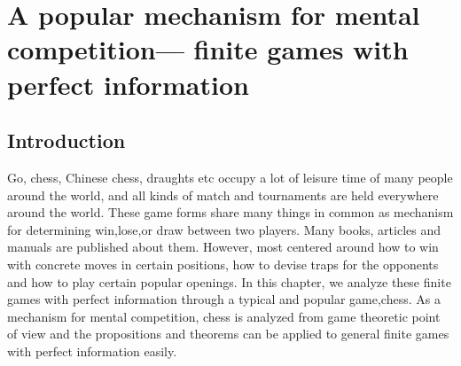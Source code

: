 
\chapter{A popular mechanism for mental competition--- finite games with perfect information}  %

\label{Chapter5} %



\section{Introduction}
 Go, chess, Chinese chess, draughts etc occupy a lot of leisure time of many people around the world, and all kinds of match and tournaments are held everywhere around the world. 
 These game forms share many things in common as mechanism for determining win,lose,or draw between two players.
 Many books, articles and manuals are published about them. However, most centered around how to win with concrete moves in certain positions, how to devise traps for the opponents and how to 
 play certain popular openings. In this chapter, we analyze these finite games with perfect information through a typical and popular game,chess. 
 As a mechanism for mental competition, chess is analyzed from game theoretic point of view and the propositions and theorems can be applied to general finite games with perfect information easily.

